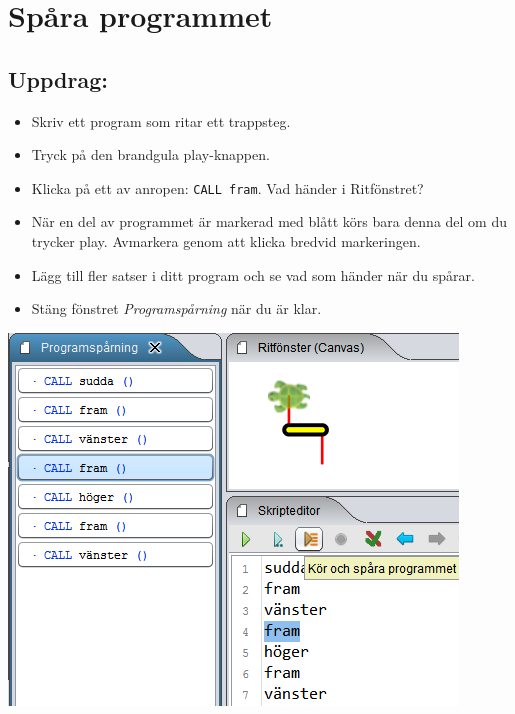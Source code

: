 \chapter{Spåra programmet}
\begin{multicols}{2}
\section*{\color{BrickRed}Uppdrag:}


\begin{itemize}

\item {Skriv ett program som ritar ett trappsteg.}
\item {Tryck på den brandgula play-knappen.}
\item {Klicka på ett av anropen: \lstinline{CALL fram}. Vad händer i Ritfönstret?}
\item {När en del av programmet är markerad med blått körs bara denna del om du trycker play. Avmarkera genom att klicka bredvid markeringen. }
\item {Lägg till fler satser i ditt program och se vad som händer när du spårar.}
\item {Stäng fönstret {\it Programspårning} när du är klar.}

\end{itemize}



\columnbreak

\begin{center}
\includegraphics{../img/trace.png}
\end{center}

\end{multicols}


